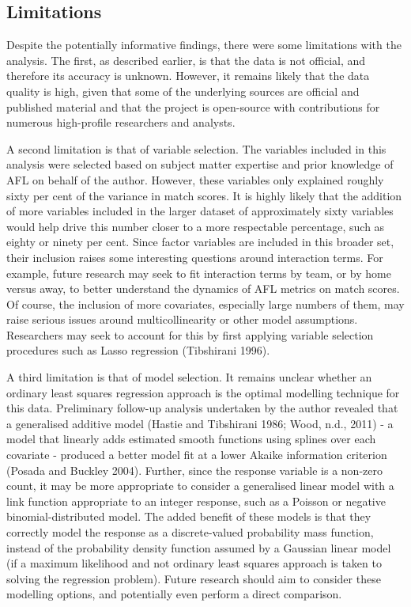 \documentclass{article}
\begin{document}
\hypertarget{limitations}{%
\subsection{Limitations}\label{limitations}}

Despite the potentially informative findings, there were some
limitations with the analysis. The first, as described earlier, is that
the data is not official, and therefore its accuracy is unknown.
However, it remains likely that the data quality is high, given that
some of the underlying sources are official and published material and
that the project is open-source with contributions for numerous
high-profile researchers and analysts.

A second limitation is that of variable selection. The variables
included in this analysis were selected based on subject matter
expertise and prior knowledge of AFL on behalf of the author. However,
these variables only explained roughly sixty per cent of the variance in
match scores. It is highly likely that the addition of more variables
included in the larger dataset of approximately sixty variables would
help drive this number closer to a more respectable percentage, such as
eighty or ninety per cent. Since factor variables are included in this
broader set, their inclusion raises some interesting questions around
interaction terms. For example, future research may seek to fit
interaction terms by team, or by home versus away, to better understand
the dynamics of AFL metrics on match scores. Of course, the inclusion of
more covariates, especially large numbers of them, may raise serious
issues around multicollinearity or other model assumptions. Researchers
may seek to account for this by first applying variable selection
procedures such as Lasso regression (Tibshirani 1996).

A third limitation is that of model selection. It remains unclear
whether an ordinary least squares regression approach is the optimal
modelling technique for this data. Preliminary follow-up analysis
undertaken by the author revealed that a generalised additive model
(Hastie and Tibshirani 1986; Wood, n.d., 2011) - a model that linearly
adds estimated smooth functions using splines over each covariate -
produced a better model fit at a lower Akaike information criterion
(Posada and Buckley 2004). Further, since the response variable is a
non-zero count, it may be more appropriate to consider a generalised
linear model with a link function appropriate to an integer response,
such as a Poisson or negative binomial-distributed model. The added
benefit of these models is that they correctly model the response as a
discrete-valued probability mass function, instead of the probability
density function assumed by a Gaussian linear model (if a maximum
likelihood and not ordinary least squares approach is taken to solving
the regression problem). Future research should aim to consider these
modelling options, and potentially even perform a direct comparison.
\end{document}
